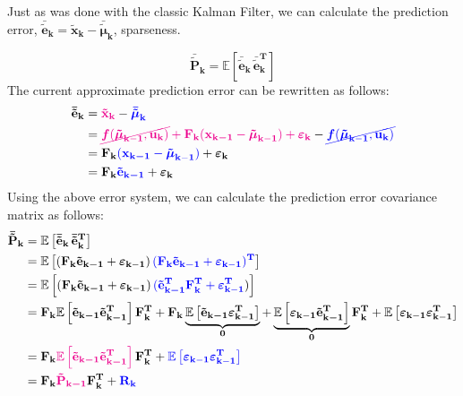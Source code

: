 \documentclass[12pt]{article}
\newcommand{\bvec}[1]{\boldsymbol{\mathbf{#1}}} %
\newcommand{\bvecT}[1]{\boldsymbol{\mathbf{#1^T}}} %
\newcommand{\mat}[1]{\boldsymbol{\mathbf{#1}}}
\newcommand{\matT}[1]{\boldsymbol{\mathbf{#1^T}}}
\newcommand{\brac}[1]{\left[#1\right]} %
\newcommand{\mb}[1]{{\boldsymbol{#1}}} %
\newcommand{\expv}[1]{\mathbb{E}\brac{#1}} %
\newcommand{\blue}[1]{\color{blue}#1\color{black}}
\newcommand{\magenta}[1]{\color{magenta}#1\color{black}}
\begin{document}
Just as was done with the classic Kalman Filter, we can calculate the prediction error, $\bvec{\bar{\tilde{e}}_k} = \bvec{\tilde{x}_k} - \mb{\bar{\tilde\mu}}_\mathbf{k}$, sparseness.

\begin{equation}
\mat{\bar{\tilde P}_k} = \expv{\bvec{\bar{\tilde{e}}_k}\, \bvecT{\bar{\tilde{e}}_k}}    
\end{equation}
The current approximate prediction error can be rewritten as follows:
\begin{equation}
    \begin{aligned}
        \bvec{\bar{\tilde{e}}_k} &= \magenta{\bvec{\tilde{x}_k}} - \blue{\mb{\bar{\tilde\mu}}_\mathbf{k}}\\
        &= \magenta{\cancel{\mb{f}(\mb{\tilde\mu}_\mathbf{k-1}, \bvec{u_k})} + \mat{F_k} (\bvec{x_{k-1}} - \mb{\tilde\mu}_\mathbf{k-1}) + \mb{\varepsilon}_\mathbf{k}} - \blue{\cancel{\mb{f}(\mb{\tilde\mu}_\mathbf{k-1}, \bvec{u_k})}}\\
        &= \mat{F_k} \blue{(\bvec{x_{k-1}} - \mb{\tilde\mu}_\mathbf{k-1})} + \mb{\varepsilon}_\mathbf{k}\\
        &= \mat{F_k}\blue{\bvec{\tilde{e}_{k-1}}} + \mb{\varepsilon}_\mathbf{k}
    \end{aligned}
\end{equation}
Using the above error system, we can calculate the prediction error covariance matrix as follows:
\begin{equation}
    \begin{aligned}
        \mat{\bar{\tilde P}_k} &= \expv{\bvec{\bar{\tilde{e}}_k}\, \bvecT{\bar{\tilde{e}}_k}}\\
        &= \expv{(\mat{F_k}\bvec{\tilde{e}_{k-1}} + \mb{\varepsilon}_\mathbf{k-1}) \, \blue{(\mat{F_k}\bvec{\tilde{e}_{k-1}} + \mb{\varepsilon}_\mathbf{k-1})^\mathbf{T}}}\\
        &= \expv{(\mat{F_k}\bvec{\tilde{e}_{k-1}} + \mb{\varepsilon}_\mathbf{k-1}) \, \blue{(\bvecT{\tilde{e}_{k-1}}\matT{F_k} + \mb{\varepsilon}_\mathbf{k-1}^\mathbf{T}})}\\
        &= \mat{F_k}\expv{\bvec{\tilde{e}_{k-1}} \bvecT{\tilde{e}_{k-1}}}\matT{F_k} + \mat{F_k} \underbrace{\expv{ \bvec{\tilde{e}_{k-1}} \mb{\varepsilon}_\mathbf{k-1}^\mathbf{T} }}_{\mat{0}} + \underbrace{\expv{\mb{\varepsilon}_\mathbf{k-1} \bvecT{\tilde{e}_{k-1}}}}_{\mat{0}} \matT{F_{k}} + \expv{\mb{\varepsilon}_\mathbf{k-1} \mb{\varepsilon}_\mathbf{k-1}^\mathbf{T}}\\
        &= \mat{F_k}\magenta{\expv{\bvec{\tilde{e}_{k-1}} \bvecT{\tilde{e}_{k-1}}}}\matT{F_k} + \blue{\expv{\mb{\varepsilon}_\mathbf{k-1} \mb{\varepsilon}_\mathbf{k-1}^\mathbf{T}}}\\
        &= \mat{F_k}\magenta{ \mat{\tilde{P}_{k-1}} } \matT{F_k} + \blue{\mat{R_k}}
    \end{aligned}
\end{equation}
\end{document}

